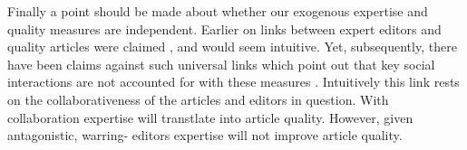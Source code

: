 Finally a point should be made about whether our exogenous expertise and quality measures are independent. Earlier on links between expert editors and quality articles were claimed \cite{wilkshuber}, and would seem intuitive. Yet, subsequently, there have been claims against such universal links which point out that key social interactions are not accounted for with these measures \cite{kane2009}. Intuitively this link rests on the collaborativeness of the articles and editors in question. With collaboration expertise will transtlate into article quality. However, given antagonistic, warring- editors expertise will not improve article quality.


